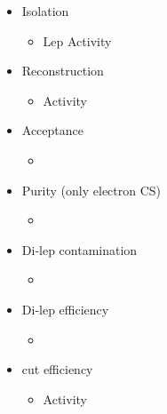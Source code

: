 \documentclass{beamer}
\begin{document}
\begin{frame}
\begin{columns}
\begin{column}{0.5\textwidth}
\begin{itemize}
        \item Isolation 
   \begin{itemize}
    \item Lep \pt Activity
   \end{itemize}
   \item Reconstruction 
   \begin{itemize}
    \item Activity
   \end{itemize}
   \item Acceptance 
   \begin{itemize}
    \item \BTags \NJets
   \end{itemize}
   \item Purity (only electron CS)
   \begin{itemize}
    \item \MHT \NJets 
   \end{itemize}
      \item Di-lep contamination
   \begin{itemize}
    \item \NJets 
   \end{itemize}
   \item Di-lep efficiency
   \begin{itemize}
    \item \NJets 
   \end{itemize}
   \item \mt cut efficiency
   \begin{itemize}
    \item Activity 
   \end{itemize}
     \end{itemize}
    \end{column}
  \end{columns}
\end{frame}
\end{document}
